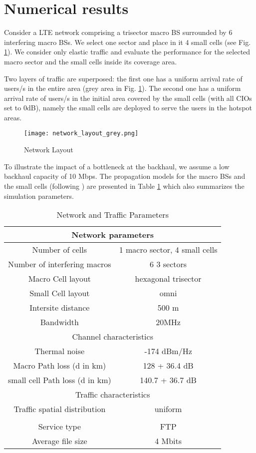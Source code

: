 \documentclass[10pt,draftclsnofoot,onecolumn]{IEEEtran}
\begin{document}
\section{Numerical results} \label{sec:numerical_illustration}
    Consider a \ac{LTE} network comprising a trisector macro \ac{BS} surrounded by 6 interfering
macro \acp{BS}. We select one sector and place in it 4 small cells
(see Fig. \ref{fig:net_lay}). We consider only elastic traffic and
evaluate the performance for the selected macro sector and the small
cells inside its coverage area.

    Two layers of traffic are superposed: the first one has a uniform
arrival rate of  users/s in the entire area (grey area in
Fig. \ref{fig:net_lay}). The second one has a uniform arrival rate
of  users/s in the initial area covered by the small
cells (with all \acp{CIO} set to 0dB), namely the small cells are
deployed to serve the users in the hotspot areas.

\begin{figure}[!ht]
\centering
\texttt{[image: network\_layout\_grey.png]}
\caption{Network Layout} \label{fig:net_lay}
\end{figure}

    To illustrate the impact of a bottleneck at the backhaul,
we assume a low backhaul capacity of 10 Mbps. The propagation models
for the macro \acp{BS} and the small cells (following \cite[Page
61]{3gpp_evolveduniversalterrestrial_2010}) are presented in Table
\ref{tab:params} which also summarizes the simulation parameters.

\begin{table}[!t]
\renewcommand{\arraystretch}{1.3}
\caption{Network and Traffic Parameters} \label{tab:params}
\centering
\begin{tabular}{|c|c|}
\hline
\multicolumn{2}{|c|}{Network parameters} \\
\hline
Number of cells & 1 macro sector, 4 small cells \\
\hline
Number of interfering macros & 6  3 sectors \\
\hline
Macro Cell layout & hexagonal trisector \\
\hline
Small Cell layout & omni \\
\hline
Intersite distance & 500 m \\
\hline
Bandwidth & 20MHz \\
\hline
\multicolumn{2}{|c|}{Channel characteristics} \\
\hline
Thermal noise & -174 dBm/Hz \\
\hline
Macro Path loss (d in km) & 128 + 36.4  dB \\
\hline
small cell Path loss (d in km) & 140.7 + 36.7  dB \\
\hline
\multicolumn{2}{|c|}{Traffic characteristics} \\
\hline
Traffic spatial distribution & uniform \\
\hline
 &  \\
\hline
Service type & FTP \\
\hline
Average file size & 4 Mbits \\
\hline
\end{tabular}
\end{table}
\end{document}

